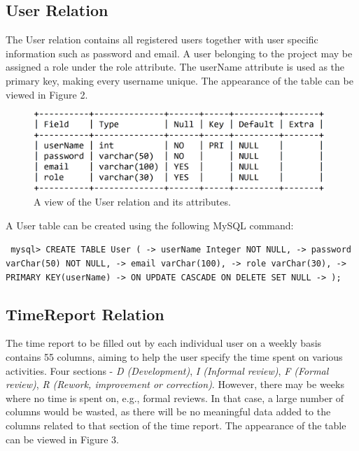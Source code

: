 \documentclass{article}
\begin{document}
\subsection{User Relation}
The User relation contains all registered users together with user specific information such as password and email. A user belonging to the project may be assigned a role under the role attribute. The userName attribute is used as the primary key, making every username unique. The appearance of the table can be viewed in Figure 2.

\begin{figure}[H]
     \centering
     \includegraphics[width=11cm]{images/SQL_tables/user.png}
     \renewcommand\figurename{Figure}
     \caption{A view of the User relation and its attributes.}
     \label{fig:my_label}
 \end{figure}

A User table can be created using the following MySQL command:
\newline

\small
\texttt{
\noindent mysql> CREATE TABLE User (\newline
\indent\indent\indent -> userName Integer NOT NULL,\newline
\indent\indent\indent -> password varChar(50) NOT NULL,\newline
\indent\indent\indent -> email varChar(100),\newline
\indent\indent\indent -> role varChar(30),\newline
\indent\indent\indent -> PRIMARY KEY(userName)\newline
\indent\indent\indent -> ON UPDATE CASCADE ON DELETE SET NULL\newline
\indent\indent\indent -> );\newline
}
\normalsize
\newpage
\subsection{TimeReport Relation}
The time report to be filled out by each individual user on a weekly basis contains 55 columns, aiming to help the user specify the time spent on various activities. Four sections - \emph{D (Development)}, \emph{I (Informal review)}, \emph{F (Formal review)}, \emph{R (Rework, improvement or correction)}. However, there may be weeks where no time is spent on, e.g.,  formal reviews. In that case, a large number of columns would be wasted, as there will be no meaningful data added to the columns related to that section of the time report.  The appearance of the table can be viewed in Figure 3.
\end{document}
